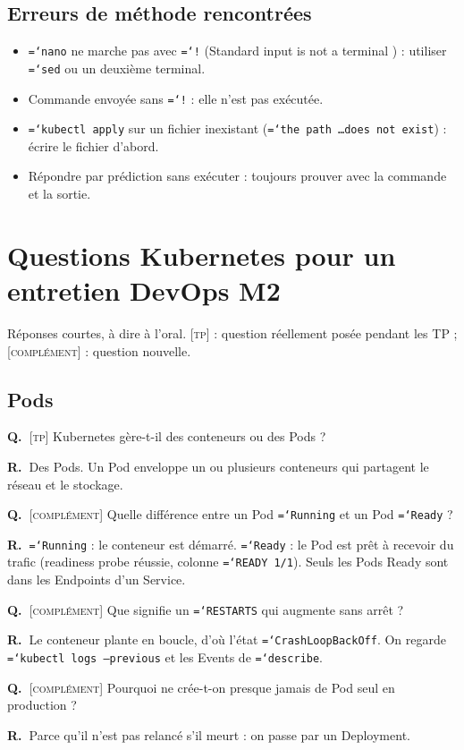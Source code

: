 \documentclass[11pt,a4paper]{article}
\newcommand{\cmd}[1]{\texttt{\hyphenchar\font=`\-#1}}
\newcommand{\tp}{\textsc{[tp]}}
\newcommand{\compl}{\textsc{[complément]}}
\newcommand{\QR}[2]{\needspace{4\baselineskip}\par\noindent\textbf{Q.~}#1\par\nopagebreak\noindent\textbf{R.~}#2\par\medskip}
\begin{document}
\subsection{Erreurs de méthode rencontrées}
\begin{itemize}
  \item \cmd{nano} ne marche pas avec \cmd{!} (\og Standard input is not a terminal \fg) : utiliser \cmd{sed} ou un deuxième terminal.
  \item Commande envoyée sans \cmd{!} : elle n'est pas exécutée.
  \item \cmd{kubectl apply} sur un fichier inexistant (\cmd{the path \ldots does not exist}) : écrire le fichier d'abord.
  \item Répondre par prédiction sans exécuter : toujours prouver avec la commande et la sortie.
\end{itemize}

\section{Questions Kubernetes pour un entretien DevOps M2}

Réponses courtes, à dire à l'oral. \tp{} : question réellement posée pendant les TP ; \compl{} : question nouvelle.

\subsection{Pods}
\QR{\tp{} Kubernetes gère-t-il des conteneurs ou des Pods ?}{Des Pods. Un Pod enveloppe un ou plusieurs conteneurs qui partagent le réseau et le stockage.}
\QR{\compl{} Quelle différence entre un Pod \cmd{Running} et un Pod \cmd{Ready} ?}{\cmd{Running} : le conteneur est démarré. \cmd{Ready} : le Pod est prêt à recevoir du trafic (readiness probe réussie, colonne \cmd{READY 1/1}). Seuls les Pods Ready sont dans les Endpoints d'un Service.}
\QR{\compl{} Que signifie un \cmd{RESTARTS} qui augmente sans arrêt ?}{Le conteneur plante en boucle, d'où l'état \cmd{CrashLoopBackOff}. On regarde \cmd{kubectl logs --previous} et les Events de \cmd{describe}.}
\QR{\compl{} Pourquoi ne crée-t-on presque jamais de Pod seul en production ?}{Parce qu'il n'est pas relancé s'il meurt : on passe par un Deployment.}
\end{document}
